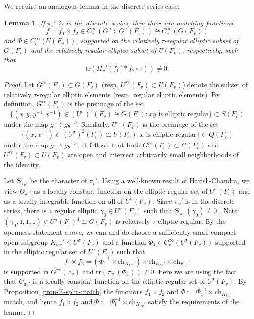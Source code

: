 \documentclass[12pt]{amsart}
\newtheorem{lem}[thm]{Lemma}
\theoremstyle{remark}
\numberwithin{equation}{section}
\theoremstyle{definition}
\numberwithin{equation}{subsection}
\begin{document}
We require an analogous lemma in the discrete series case:

\begin{lem} \label{lem-sqint}
If $\pi_v'$ is in the discrete series,
then
there are matching functions
$$
f=f_1 \times f_2 \in
C_c^{\infty}(G^{\sigma} \times G^{\sigma}(F_v))\cong C_c^{\infty}(G(F_v))
$$
and
$\Phi \in
C_c^{\infty}(U(F_v))$, supported on the relatively $\tau$-regular elliptic
subset of $G(F_v)$  and the relatively regular elliptic subset of
$U(F_v)$, respectively, such that
$$
\mathrm{tr}\left( \Pi_v'(f_1^{-\tau}*f_2 \circ \tau)\right) \neq 0.
$$

\end{lem}

\begin{proof}
Let $G^{re}(F_v) \subset G(F_v)$ (resp.
$U^{re}(F_v)\subset U(F_v)$) denote the subset of relatively
$\tau$-regular elliptic elements (resp.~regular elliptic elements).  By
definition, $G^{re}(F_v)$ is the preimage of the set
$$
\{(x,y,y^{-1},x^{-1})\in (U^{\sigma})^4(F_v) \cong G(F_v):xy \textrm{ is
elliptic regular}\}\subset S(F_v)
$$
under the map $g \mapsto g g^{-\theta}$.   Similarly, $U^{re}(F_v)$ is the preimage
of the set
$$
\{(x,x^{-1}) \in (U^{\sigma})^2(F_v) \cong U(F_v) : x \textrm{ is elliptic regular}\}
\subset Q(F_v)
$$
under the map $g \mapsto g g^{-\sigma}$.  It follows that both
$G^{re}(F_v)\subset G(F_v)$ and
$U^{re}(F_v)\subset U(F_v)$ are open and intersect arbitrarily small
neighborhoods of the identity.

Let $\Theta_{\pi_v'}$ be the character of $\pi_v'$.  Using a well-known result of Harish-Chandra, we
view $\Theta_{\pi_v'}$ as a locally constant function on the elliptic regular set of $U^{\sigma}(F_v)$
and as a locally integrable function on all of $U^{\sigma}(F_v)$.  Since
$\pi_v'$ is in the discrete series, there is a regular elliptic $\gamma_0 \in U^{\sigma}(F_v)$ such that
$\Theta_{\pi_v'}(\gamma_0) \neq 0$ \cite[Proposition 5.5]{RogGLn}.
Note $(\gamma_0,1,1,1) \in U^{\sigma}(F_v)^4 \cong G(F_v)$ is relatively $\tau$-elliptic regular.  By the openness
statement above, we can  and do choose a sufficiently small compact open subgroup $K_{Uv}' \leq U^{\sigma}(F_v)$ and a function $\Phi_1 \in
C_c^{\infty}(U^{\sigma}(F_v))$ supported in the elliptic regular set of $U^{\sigma}(F_v)$ such that
$$
f_1 \times f_2=(\Phi_{1}^{-1} \times \mathrm{ch}_{K_{Uv}'}) \times \mathrm{ch}_{K_{Uv}'} \times \mathrm{ch}_{K_{Uv}'}
$$
is supported in $G^{re}(F_v)$ and $\mathrm{tr}(\pi_{v}'(\Phi_1)) \neq 0$.  Here we are using the fact that $\Theta_{\pi_v'}$ is a locally constant
function on the elliptic regular set of $U^{\sigma}(F_v)$.  By Proposition \ref{prop-E-split-match} the functions $f_1 \times f_2$ and $\Phi:=\Phi_1^{-1} \times \mathrm{ch}_{K_{Uv}'}$ match, and hence $f_1 \times f_2$ and
 $\Phi:=\Phi_1^{-1} \times \mathrm{ch}_{K_{Uv}'}$ satisfy the requirements of the lemma.
\end{proof}
\end{document}
